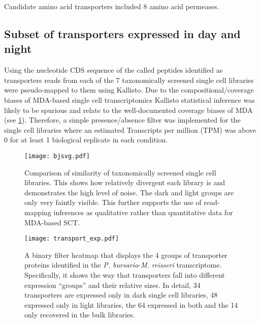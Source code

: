 Candidate amino acid transporters included 8 amino acid
permeases.
%

\subsection{Subset of transporters expressed in day and night}

Using the nucleotide CDS sequence of the called peptides identified as transporters
reads from each of the 7 taxonomically screened single cell libraries were pseudo-mapped
to them using Kallisto. 
Due to the compositional/coverage biases of MDA-based single cell transcriptomics 
Kallisto statistical inference was likely to be spurious and relate to the 
well-documented coverage biases of MDA (see \cref{fig:jsd}). Therefore, a simple presence/absence
filter was implemented for the single cell libraries where an estimated
Transcripts per million (TPM) was above 0 for at least 1 biological replicate
in each condition. 

\begin{figure}
    \centering
    \texttt{[image: bjsvg.pdf]}
    \caption[Jasper-shannon divergence of single cell transcriptome libraries]{Comparison of similarity of 
    taxonomically screened single cell libraries.  This shows how relatively divergent
each library is and demonstrates the high level of noise.  The dark and light groups
are only very faintly visible.  This further supports the use of read-mapping inferences
as qualitative rather than quantitative data for MDA-based SCT.}
\label{fig:jsd}
\end{figure}

 \begin{figure}
     \centering
     \texttt{[image: transport\_exp.pdf]}
     \caption[Binary filter heatmap of transporter expression between day and night]{A binary filter heatmap that displays the 4 groups of transporter
         proteins identified in the \textit{P. bursaria}-\textit{M. reisseri} 
         transcriptome.  Specifically, it shows the way that transporters
         fall into different expression ``groups'' and their relative sizes.
         In detail, 34 transporters are expressed only
         in dark single cell libraries, 48 expressed only in light libraries, the 64
         expressed in both and the 14 only recovered in the bulk libraries.}
     \label{fig:binary_expression_heatmap}
 \end{figure}


